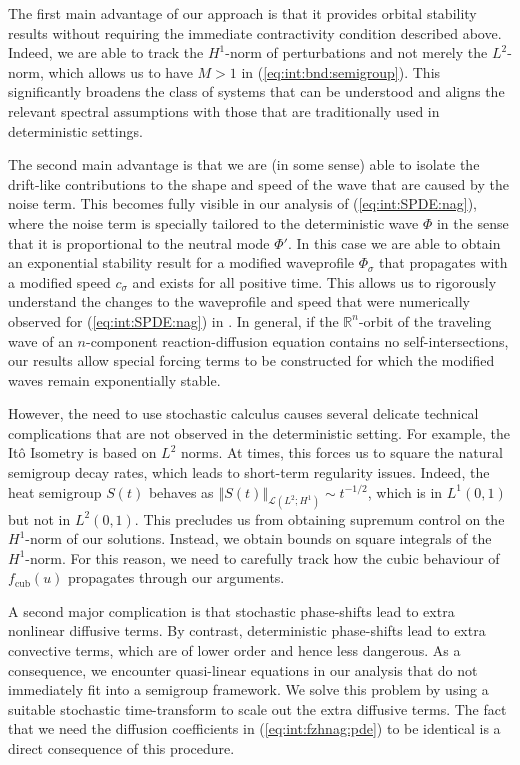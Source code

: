 \documentclass[10pt]{articleHJ}
\newcommand{\Real}{\mathbb{R}}							%
\newcommand{\norm}[1]{\left\Vert#1\right\Vert}		%
\newcommand{\sref}[1]{(\ref{#1})}                       %
\numberwithin{equation}{section}
\begin{document}
The first main advantage of our approach is that it provides
orbital stability results without requiring the
immediate contractivity condition described above.
Indeed, we are able to track the $H^1$-norm of perturbations
and not merely the $L^2$-norm, which allows us to have $M > 1$
in \sref{eq:int:bnd:semigroup}.
This significantly broadens
the class of systems that can be understood and
aligns the relevant spectral assumptions
with those that are traditionally used in deterministic settings.

The second main advantage is that we are (in some sense) able to isolate
the drift-like contributions to the shape and speed of the wave
that are caused by the noise term. This becomes fully visible
in our analysis of \sref{eq:int:SPDE:nag}, where the noise term is
specially tailored to the deterministic wave $\Phi$ in the sense that it is proportional to
the neutral mode $\Phi'$. In this case we are able
to obtain an exponential stability result for a modified waveprofile $\Phi_{\sigma}$
that propagates with a modified speed $c_{\sigma}$
and exists for all positive time.
This allows us to rigorously
understand the changes to the waveprofile and speed that
were numerically observed for \sref{eq:int:SPDE:nag} in \cite{Lord2012}.
In general, if the $\Real^n$-orbit of the traveling wave
of an $n$-component reaction-diffusion equation contains no self-intersections,
our results allow special forcing terms to be constructed
for which the modified waves remain exponentially stable.



However, the need to use stochastic calculus
causes several delicate technical complications that are not observed in the
deterministic setting. For example, the It\^o Isometry is based on $L^2$ norms.
At times, this forces us to square the natural semigroup decay rates,
which leads to short-term regularity issues.
Indeed, the heat semigroup $S(t)$ behaves as $\norm{S(t)}_{\mathcal{L}(L^2; H^1)} \sim t^{-1/2}$,
which is in $L^1(0,1 )$ but not in $L^2(0,1)$.
This precludes us from obtaining supremum control on the $H^1$-norm of our solutions.
Instead, we obtain bounds on square integrals of the $H^1$-norm. For this reason,
we need to carefully track how the cubic behaviour of $f_{\mathrm{cub}}(u)$ propagates through
our arguments.

A second major complication is that stochastic phase-shifts lead to extra nonlinear
diffusive terms. By contrast, deterministic phase-shifts lead to extra convective terms,
which are of lower order and hence less dangerous.
As a consequence, we encounter quasi-linear equations
in our analysis that do not immediately fit into a semigroup framework.
We solve this problem by using a suitable stochastic time-transform to scale
out the extra diffusive terms. The fact that we need
the diffusion coefficients in \sref{eq:int:fzhnag:pde} to be identical
is a direct consequence of this procedure.
\end{document}
